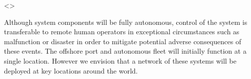 <>

Although system components will be fully autonomous, control of the system is transferable to remote human operators in exceptional circumstances such as malfunction or disaster in order to mitigate potential adverse consequences of these events. The offshore port and autonomous fleet will initially function at a single location. However we envision that a network of these systems will be deployed at key locations around the world.